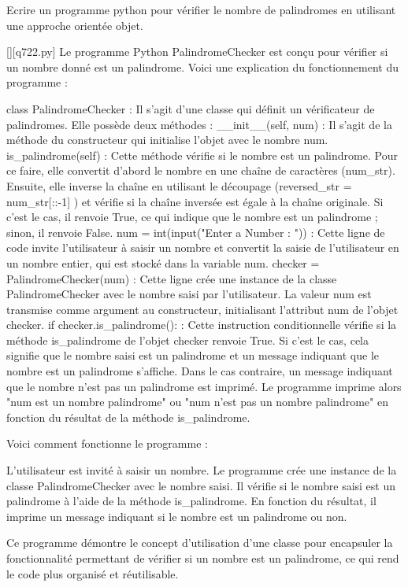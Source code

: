         \question
        Ecrire un programme python pour vérifier le nombre de palindromes en utilisant une approche orientée objet.
        \par
        \begin{solution}
            \renewcommand{\nomfichier}{q722.py}
            \pythonfile{\chemincode \nomfichier}[][\nomfichier]
            Le programme Python PalindromeChecker est conçu pour vérifier si un nombre donné est un palindrome. Voici une explication du fonctionnement du programme :

    class PalindromeChecker : Il s'agit d'une classe qui définit un vérificateur de palindromes. Elle possède deux méthodes :
        __init__(self, num) : Il s'agit de la méthode du constructeur qui initialise l'objet avec le nombre num.
        is_palindrome(self) : Cette méthode vérifie si le nombre est un palindrome. Pour ce faire, elle convertit d'abord le nombre en une chaîne de caractères (num_str). Ensuite, elle inverse la chaîne en utilisant le découpage (reversed_str = num_str[::-1] ) et vérifie si la chaîne inversée est égale à la chaîne originale. Si c'est le cas, il renvoie True, ce qui indique que le nombre est un palindrome ; sinon, il renvoie False.
    num = int(input("Enter a Number : ")) : Cette ligne de code invite l'utilisateur à saisir un nombre et convertit la saisie de l'utilisateur en un nombre entier, qui est stocké dans la variable num.
    checker = PalindromeChecker(num) : Cette ligne crée une instance de la classe PalindromeChecker avec le nombre saisi par l'utilisateur. La valeur num est transmise comme argument au constructeur, initialisant l'attribut num de l'objet checker.
    if checker.is_palindrome(): : Cette instruction conditionnelle vérifie si la méthode is_palindrome de l'objet checker renvoie True. Si c'est le cas, cela signifie que le nombre saisi est un palindrome et un message indiquant que le nombre est un palindrome s'affiche. Dans le cas contraire, un message indiquant que le nombre n'est pas un palindrome est imprimé.
    Le programme imprime alors "{num} est un nombre palindrome" ou "{num} n'est pas un nombre palindrome" en fonction du résultat de la méthode is_palindrome.

Voici comment fonctionne le programme :

    L'utilisateur est invité à saisir un nombre.
    Le programme crée une instance de la classe PalindromeChecker avec le nombre saisi.
    Il vérifie si le nombre saisi est un palindrome à l'aide de la méthode is_palindrome.
    En fonction du résultat, il imprime un message indiquant si le nombre est un palindrome ou non.

Ce programme démontre le concept d'utilisation d'une classe pour encapsuler la fonctionnalité permettant de vérifier si un nombre est un palindrome, ce qui rend le code plus organisé et réutilisable.
        \end{solution}
        

